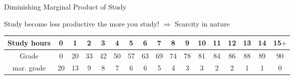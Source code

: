 \documentclass[11pt,aspectratio=43,usenames,dvipsnames]{beamer}
\theoremstyle{definition}
\begin{document}
\begin{frame}[fragile]{Diminishing Marginal Product of Study}
\label{slide:Diminishing_Marginal_Product_of_Study}

Study become less productive the more you study! $ \Rightarrow  $ Scarcity in nature

\begin{center}
\tiny
\begin{tabular}{c|c|c|c|c|c|c|c|c|c|c|c|c|c|c|c|c}
    Study hours  & 0  & 1  & 2  & 3  & 4  & 5  & 6  & 7  & 8  & 9  & 10  & 11  & 12  & 13  & 14  & 15$+$
    \\
    \hline
    Grade  & 0  & 20  & 33  & 42  & 50  & 57  & 63  & 69  & 74  & 78  & 81  & 84  & 86  & 88  & 89  & 90
    \\
    \hline
    mar. grade  & 20  & 13  & 9  & 8  & 7  & 6  & 6  & 5  & 4  & 3  & 3  & 2  & 2  & 1  &  1 & 0
    \\
\end{tabular}

\end{center}

\end{frame}
\end{document}
